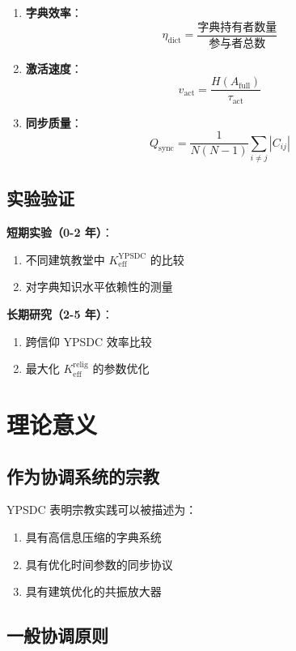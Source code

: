 \documentclass[12pt,a4paper]{article}
\begin{document}
	\begin{enumerate}
		\item \textbf{字典效率}：
		\[
		\eta_{\mathrm{dict}} = \frac{\text{字典持有者数量}}{\text{参与者总数}}
		\]
		\item \textbf{激活速度}：
		\[
		v_{\mathrm{act}} = \frac{H(A_{\mathrm{full}})}{\tau_{\mathrm{act}}}
		\]
		\item \textbf{同步质量}：
		\[
		Q_{\mathrm{sync}} = \frac{1}{N(N-1)} \sum_{i \neq j} |C_{ij}|
		\]
	\end{enumerate}
	
	\subsection{实验验证}
	
	\textbf{短期实验（0-2 年）}：
	\begin{enumerate}
		\item 不同建筑教堂中 $K_{\mathrm{eff}}^{\mathrm{YPSDC}}$ 的比较
		\item 对字典知识水平依赖性的测量
	\end{enumerate}
	
	\textbf{长期研究（2-5 年）}：
	\begin{enumerate}
		\item 跨信仰 YPSDC 效率比较
		\item 最大化 $K_{\mathrm{eff}}^{\mathrm{relig}}$ 的参数优化
	\end{enumerate}
	
	\section{理论意义}
	
	\subsection{作为协调系统的宗教}
	
	YPSDC 表明宗教实践可以被描述为：
	\begin{enumerate}
		\item 具有高信息压缩的字典系统
		\item 具有优化时间参数的同步协议
		\item 具有建筑优化的共振放大器
	\end{enumerate}
	
	\subsection{一般协调原则}
	
\end{document}
